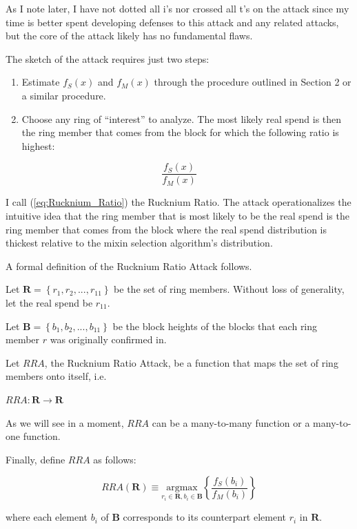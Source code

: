 \documentclass[english]{paper}
\begin{document}
As I note later, I have not dotted all i's nor crossed all t's on
the attack since my time is better spent developing defenses to this
attack and any related attacks, but the core of the attack likely
has no fundamental flaws.

The sketch of the attack requires just two steps:
\begin{enumerate}
\item Estimate $f_{S}(x)$ and $f_{M}(x)$ through the procedure outlined
in Section 2 or a similar procedure.
\item Choose any ring of ``interest'' to analyze. The most likely real
spend is then the ring member that comes from the block for which
the following ratio is highest:
\end{enumerate}
\begin{equation}
\dfrac{f_{S}(x)}{f_{M}(x)}\label{eq:Rucknium_Ratio}
\end{equation}

I call (\ref{eq:Rucknium_Ratio}) the Rucknium Ratio. The attack operationalizes
the intuitive idea that the ring member that is most likely to be
the real spend is the ring member that comes from the block where
the real spend distribution is thickest relative to the mixin selection
algorithm's distribution.

A formal definition of the Rucknium Ratio Attack follows.

Let $\boldsymbol{R}=\left\{ r_{1},r_{2},...,r_{11}\right\} $ be the
set of ring members. Without loss of generality, let the real spend
be $r_{11}$.

Let $\boldsymbol{B}=\left\{ b_{1},b_{2},...,b_{11}\right\} $ be the
block heights of the blocks that each ring member $r$ was originally
confirmed in.

Let $RRA$, the Rucknium Ratio Attack, be a function that maps the
set of ring members onto itself, i.e.

$RRA:\boldsymbol{R}\rightarrow\boldsymbol{R}$

As we will see in a moment, $RRA$ can be a many-to-many function
or a many-to-one function.

Finally, define $RRA$ as follows:

\begin{equation}
RRA(\boldsymbol{R})\equiv\underset{r_{i}\in\boldsymbol{R},b_{i}\in\boldsymbol{B}}{\mathrm{argmax}}\left\{ \dfrac{f_{S}(b_{i})}{f_{M}(b_{i})}\right\} \label{eq:RRA_formal}
\end{equation}

where each element $b_{i}$ of $\boldsymbol{B}$ corresponds to its
counterpart element $r_{i}$ in $\boldsymbol{R}$.
\end{document}
